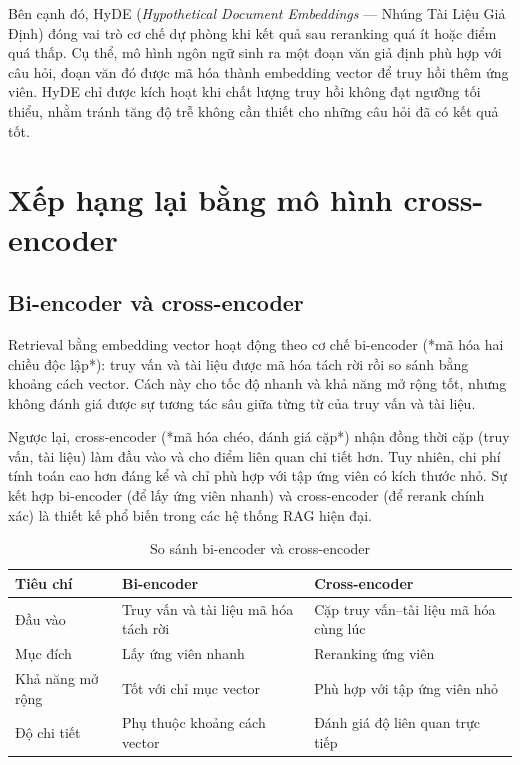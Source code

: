 \documentclass[../DoAn.tex]{subfiles}
\begin{document}
Bên cạnh đó, HyDE (\textit{Hypothetical Document Embeddings} \cite{hyde2022} --- Nhúng Tài Liệu
Giả Định) đóng vai trò cơ chế dự phòng khi kết quả sau reranking quá ít hoặc
điểm quá thấp. Cụ thể, mô hình ngôn ngữ sinh ra một đoạn văn giả định phù hợp
với câu hỏi, đoạn văn đó được mã hóa thành embedding vector để truy hồi thêm
ứng viên. HyDE chỉ được kích hoạt khi chất lượng truy hồi không đạt ngưỡng tối
thiểu, nhằm tránh tăng độ trễ không cần thiết cho những câu hỏi đã có kết quả
tốt.

\section{Xếp hạng lại bằng mô hình cross-encoder}

\subsection{Bi-encoder và cross-encoder}

Retrieval bằng embedding vector hoạt động theo cơ chế bi-encoder (*mã hóa hai
chiều độc lập*): truy vấn và tài liệu được mã hóa tách rời rồi so sánh bằng
khoảng cách vector. Cách này cho tốc độ nhanh và khả năng mở rộng tốt, nhưng
không đánh giá được sự tương tác sâu giữa từng từ của truy vấn và tài liệu.

Ngược lại, cross-encoder (*mã hóa chéo, đánh giá cặp*) nhận đồng thời cặp
(truy vấn, tài liệu) làm đầu vào và cho điểm liên quan chi tiết hơn. Tuy nhiên,
chi phí tính toán cao hơn đáng kể và chỉ phù hợp với tập ứng viên có kích thước
nhỏ. Sự kết hợp bi-encoder (để lấy ứng viên nhanh) và cross-encoder (để rerank
chính xác) là thiết kế phổ biến trong các hệ thống RAG hiện đại.

\begin{table}[H]
\centering
\begin{tabular}{|l|p{4.2cm}|p{4.2cm}|}
\hline
\textbf{Tiêu chí} & \textbf{Bi-encoder} & \textbf{Cross-encoder} \\
\hline
Đầu vào & Truy vấn và tài liệu mã hóa tách rời & Cặp truy vấn--tài liệu mã hóa
cùng lúc \\
\hline
Mục đích & Lấy ứng viên nhanh & Reranking ứng viên \\
\hline
Khả năng mở rộng & Tốt với chỉ mục vector & Phù hợp với tập ứng viên nhỏ \\
\hline
Độ chi tiết & Phụ thuộc khoảng cách vector & Đánh giá độ liên quan trực tiếp \\
\hline
\end{tabular}
\caption{So sánh bi-encoder và cross-encoder}
\label{tab:biencoder_crossencoder}
\end{table}
\end{document}
